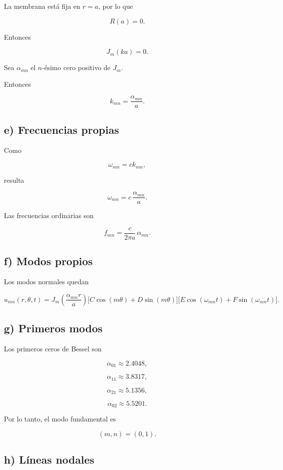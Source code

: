 \documentclass[11pt,spanish]{article}
\begin{document}
La membrana está fija en $r=a$, por lo que

\[
R(a)=0.
\]

Entonces

\[
J_m(ka)=0.
\]

Sea $\alpha_{mn}$ el $n$-ésimo cero positivo de $J_m$.

Entonces

\[
\boxed{
k_{mn}
=
\frac{\alpha_{mn}}{a}
}.
\]

\subsection*{e) Frecuencias propias}

Como

\[
\omega_{mn}=ck_{mn},
\]

resulta

\[
\boxed{
\omega_{mn}
=
c\,
\frac{\alpha_{mn}}{a}
}.
\]

Las frecuencias ordinarias son

\[
\boxed{
f_{mn}
=
\frac{c}{2\pi a}\,
\alpha_{mn}
}.
\]

\subsection*{f) Modos propios}

Los modos normales quedan

\[
\boxed{
u_{mn}(r,\theta,t)
=
J_m\!\left(
\frac{\alpha_{mn}r}{a}
\right)
\Big[
C\cos(m\theta)
+
D\sin(m\theta)
\Big]
\Big[
E\cos(\omega_{mn}t)
+
F\sin(\omega_{mn}t)
\Big].
}
\]

\subsection*{g) Primeros modos}

Los primeros ceros de Bessel son

\[
\alpha_{01}\approx2.4048,
\]

\[
\alpha_{11}\approx3.8317,
\]

\[
\alpha_{21}\approx5.1356,
\]

\[
\alpha_{02}\approx5.5201.
\]

Por lo tanto, el modo fundamental es

\[
(m,n)=(0,1).
\]

\subsection*{h) Líneas nodales}
\end{document}
